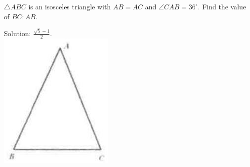 \documentclass{article}
\begin{document}
\(\triangle A B C\) is an isosceles triangle with \(A B=A C\) and \(\angle C A B=36^{\circ}\). Find the value of \(B C: A B\).

Solution: \(\frac{\sqrt{5}-1}{2}\).\\
\centering
\includegraphics[width=\textwidth]{images/061.jpg}
\end{document}
